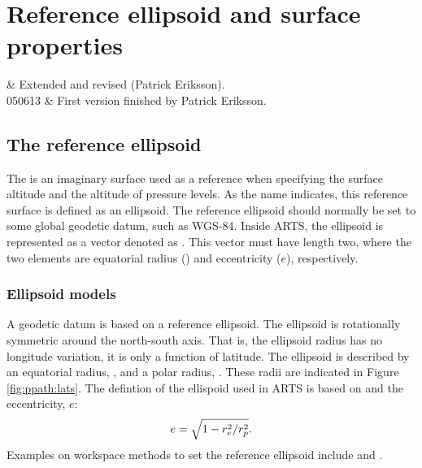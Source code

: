 \chapter{Reference ellipsoid and surface properties}
 \label{sec:surface}


 & Extended and revised (Patrick Eriksson). \\
  050613 & First version finished by Patrick Eriksson. \\
\stophistory


\graphicspath{{Figs/ppath/}}


\section{The reference ellipsoid}
\label{sec:fm_defs:geoid}

The  is an imaginary surface used as a reference when
specifying the surface altitude and the altitude of pressure levels. As the
name indicates, this reference surface is defined as an ellipsoid. The
reference ellipsoid should normally be set to some global geodetic datum, such
as WGS-84.
Inside ARTS, the ellipsoid is represented as a vector denoted as
. This vector must have length two, where the two
elements are equatorial radius () and eccentricity ($e$), respectively.




\subsection{Ellipsoid models}
\label{sec:ppath:geoid}

A geodetic datum is based on a reference ellipsoid. The ellipsoid is
rotationally symmetric around the north-south axis. That is, the ellipsoid
radius has no longitude variation, it is only a function of latitude. The
ellipsoid is described by an equatorial radius, , and a polar radius,
. These radii are indicated in Figure \ref{fig:ppath:lats}. The
defintion of the ellispoid used in ARTS is based on  and the
eccentricity, $e$:
\begin{equation}
 e = \sqrt{1-r_{e}^2/r_{p}^2}.
 \label{eq:ppath:eccentricity} 
\end{equation}
Examples on workspace methods to set the reference ellipsoid include 
 and .

